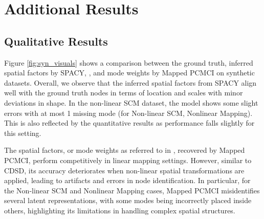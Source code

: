 

\section{Additional Results} \label{sec:additional_results}


\subsection{Qualitative Results}
\label{sec:syn_qual_results}
Figure \ref{fig:syn_visuals} shows a comparison between the ground truth, inferred spatial factors by SPACY, , and mode weights by Mapped PCMCI on synthetic datasets. Overall, we observe that the inferred spatial factors from SPACY align well with the ground truth nodes in terms of location and scales with minor deviations in shape. In the non-linear SCM dataset, the model shows some slight errors with at most 1 missing mode (for Non-linear SCM, Nonlinear Mapping).  This is also reflected by the quantitative results as performance falls slightly for this setting.


The spatial factors, or mode weights as referred to in \citet{xavi2022teleconnection}, recovered by Mapped PCMCI, perform competitively in linear mapping settings. However, similar to CDSD, its accuracy deteriorates when non-linear spatial transformations are applied, leading to artifacts and errors in node identification. In particular, for the Non-linear SCM and Nonlinear Mapping cases, Mapped PCMCI misidentifies several latent representations, with some modes being incorrectly placed inside others, highlighting its limitations in handling complex spatial structures.


